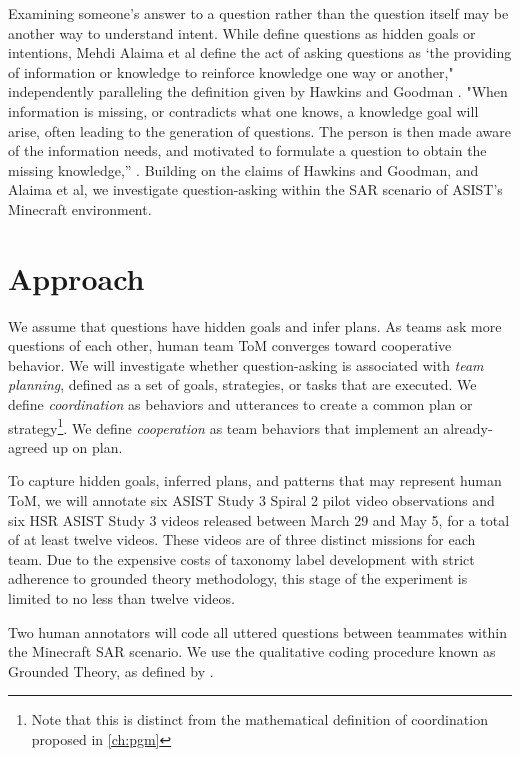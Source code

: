 Examining someone's answer to a question rather than the question itself may be
another way to understand intent. While \cite{hawkings_goodman_2017} define questions as
hidden goals or intentions, Mehdi Alaima et al define the act of asking
questions as ‘the providing of information or knowledge to reinforce knowledge
one way or another," independently paralleling the definition given by Hawkins
and Goodman . "When information is missing, or contradicts what one knows, a
knowledge goal will arise, often leading to the generation of questions. The
person is then made aware of the information needs, and motivated to formulate
a question to obtain the missing knowledge,” \citep{alaimi_2020}. Building on
the claims of Hawkins and Goodman, and Alaima et al, we investigate
question-asking within the SAR scenario of ASIST’s Minecraft environment. 


\section{Approach}

We assume that questions have hidden goals and infer plans. As teams ask more
questions of each other, human team ToM converges toward cooperative behavior.
We will investigate whether question-asking is associated with \emph{team
planning}, defined as a set of goals, strategies, or tasks that are executed.
We define \emph{coordination} as behaviors and utterances to create a common
plan or strategy\footnote{Note that this is distinct from the mathematical
definition of coordination proposed in \autoref{ch:pgm}}. We define
\emph{cooperation} as team behaviors that implement an already-agreed up on
plan.

To capture hidden goals, inferred plans, and patterns that may represent human
ToM, we will annotate six ASIST Study 3 Spiral 2 pilot video observations and
six HSR ASIST Study 3 videos released between March 29 and May 5, for a total
of at least twelve videos. These videos are of three distinct missions for each
team. Due to the expensive costs of taxonomy label development with strict
adherence to grounded theory methodology, this stage of the experiment is
limited to no less than twelve videos. 

Two human annotators will code all uttered questions between teammates within
the Minecraft SAR scenario.  We use the qualitative coding procedure known as
Grounded Theory, as defined by \citet{corbin_strauss_2015}. 

